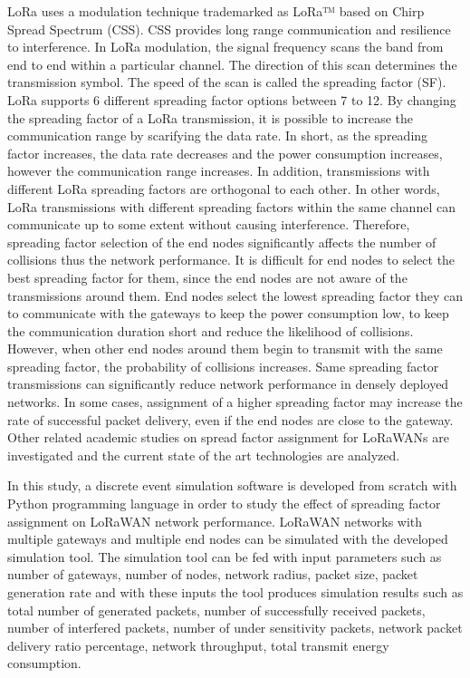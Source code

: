 LoRa uses a modulation technique trademarked as LoRa™ based on Chirp Spread Spectrum (CSS). CSS provides long range communication and resilience to interference. In LoRa modulation, the signal frequency scans the band from end to end within a particular channel. The direction of this scan determines the transmission symbol. The speed of the scan is called the spreading factor (SF). LoRa supports 6 different spreading factor options between 7 to 12. By changing the spreading factor of a LoRa transmission, it is possible to increase the communication range by scarifying the data rate. In short, as the spreading factor increases, the data rate decreases and the power consumption increases, however the communication range increases. In addition, transmissions with different LoRa spreading factors are orthogonal to each other. In other words, LoRa transmissions with different spreading factors within the same channel can communicate up to some extent without causing interference. Therefore, spreading factor selection of the end nodes significantly affects the number of collisions thus the network performance. It is difficult for end nodes to select the best spreading factor for them, since the end nodes are not aware of the transmissions around them. End nodes select the lowest spreading factor they can to communicate with the gateways to keep the power consumption low, to keep the communication duration short and reduce the likelihood of collisions. However, when other end nodes around them begin to transmit with the same spreading factor, the probability of collisions increases. Same spreading factor transmissions can significantly reduce network performance in densely deployed networks. In some cases, assignment of a higher spreading factor may increase the rate of successful packet delivery, even if the end nodes are close to the gateway. Other related academic studies on spread factor assignment for LoRaWANs are investigated and the current state of the art technologies are analyzed.

In this study, a discrete event simulation software is developed from scratch with Python programming language in order to study the effect of spreading factor assignment on LoRaWAN network performance. LoRaWAN networks with multiple gateways and multiple end nodes can be simulated with the developed simulation tool. The simulation tool can be fed with input parameters such as number of gateways, number of nodes, network radius, packet size, packet generation rate and with these inputs the tool produces simulation results such as total number of generated packets, number of successfully received packets, number of interfered packets, number of under sensitivity packets, network packet delivery ratio percentage, network throughput, total transmit energy consumption.

